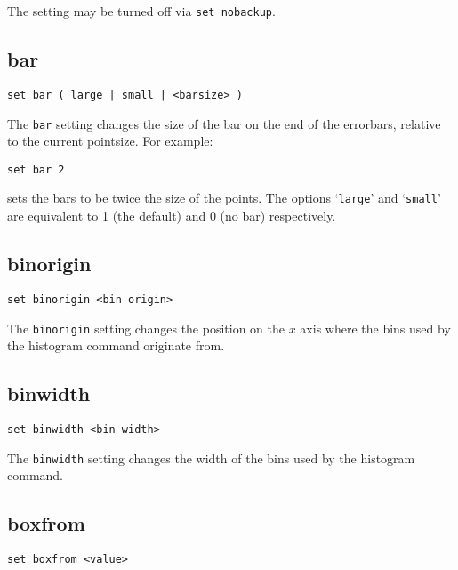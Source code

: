 \documentclass[a4paper,onecolumn,11pt]{book}
\begin{document}
The setting may be turned off via {\tt set nobackup}.


\subsection{bar}

\begin{verbatim}
set bar ( large | small | <barsize> )
\end{verbatim}

The {\tt bar} setting changes the size of the bar on the end of the errorbars,
relative to the current pointsize.  For example:

\begin{verbatim}
set bar 2
\end{verbatim}

\noindent sets the bars to be twice the size of the points.  The options `{\tt large}' and
`{\tt small}' are equivalent to 1 (the default) and 0 (no bar) respectively.

\subsection{binorigin}

\begin{verbatim}
set binorigin <bin origin>
\end{verbatim}

The {\tt binorigin} setting changes the position on the $x$ axis where
the bins used by the histogram command originate from.

\subsection{binwidth}

\begin{verbatim}
set binwidth <bin width>
\end{verbatim}

The {\tt binwidth} setting changes the width of the bins used by the histogram
command.

\subsection{boxfrom}

\begin{verbatim}
set boxfrom <value>
\end{verbatim}
\end{document}
